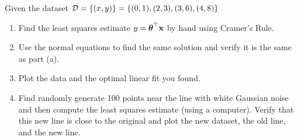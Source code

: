\documentclass[12pt,letterpaper]{hmcpset}
\begin{document}
\begin{problem}[2]
Given the dataset ${\cal D} = \{(x,y)\} = \{(0,1), (2,3), (3,6), (4,8)\}$
\begin{enumerate}
   \item Find the least squares estimate $y = \hbox{\boldmath$\theta$}^\top{\bf x}$ by hand using
        Cramer's Rule.
    \item Use the normal equations to find the same solution and verify it
        is the same as part (a).
    \item Plot the data and the optimal linear fit you found.
    \item Find randomly generate 100 points near the line with white Gaussian
        noise and then compute the least squares estimate (using a computer).
        Verify that this new line is close to the original and plot the new
        dataset, the old line, and the new line.
\end{enumerate}

\end{problem}
\end{document}
